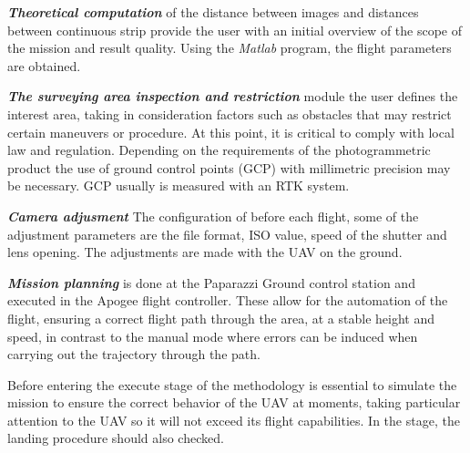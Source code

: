 \textit{\textbf{Theoretical computation}} of the distance between images and distances between continuous strip provide the user with an initial overview of the scope of the mission and result quality. Using the \textit{Matlab} program, the flight parameters are obtained.

\textit{\textbf{The surveying area inspection and restriction}} module the user defines the interest area, taking in consideration factors such as obstacles that may restrict certain maneuvers or procedure. At this point, it is critical to comply with local law and regulation. Depending on the requirements of the photogrammetric product the use of ground control points (GCP) with millimetric precision may be necessary. GCP usually is measured with an RTK system.

\textit{\textbf{Camera adjusment}}\newline
The configuration of before each flight, some of the adjustment parameters are the file format, ISO value, speed of the shutter and lens opening. The adjustments are made with the UAV on the ground.

\textit{\textbf{Mission planning}} is done at the Paparazzi Ground control station and executed in the Apogee flight controller. These allow for the automation of the flight, ensuring a correct flight path through the area, at a stable height and speed, in contrast to the manual mode where errors can be induced when carrying out the trajectory through the path. 

Before entering the execute stage of the methodology is essential to simulate the mission to ensure the correct behavior of the UAV  at moments, taking particular attention to the UAV so it will not exceed its flight capabilities. In the stage, the landing procedure should also checked.
